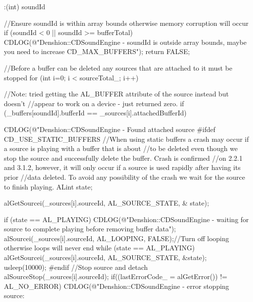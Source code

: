 \begin{DoxyCode}
                     :(int) soundId
{
        //Ensure soundId is within array bounds otherwise memory corruption
       will occur
        if (soundId < 0 || soundId >= bufferTotal) {
                CDLOG(@"Denshion::CDSoundEngine - soundId is outside array
       bounds, maybe you need to increase CD_MAX_BUFFERS");
                return FALSE;
        }

        //Before a buffer can be deleted any sources that are attached to it
       must be stopped
        for (int i=0; i < sourceTotal_; i++) {
                //Note: tried getting the AL_BUFFER attribute of the source
       instead but doesn't
                //appear to work on a device - just returned zero.
                if (_buffers[soundId].bufferId == _sources[i].attachedBufferId)
       {

                        CDLOG(@"Denshion::CDSoundEngine - Found attached source
#ifdef CD_USE_STATIC_BUFFERS
                        //When using static buffers a crash may occur if a
       source is playing with a buffer that is about
                        //to be deleted even though we stop the source and
       successfully delete the buffer. Crash is confirmed
                        //on 2.2.1 and 3.1.2, however, it will only occur if a
       source is used rapidly after having its prior
                        //data deleted. To avoid any possibility of the crash
       we wait for the source to finish playing.
                        ALint state;

                        alGetSourcei(_sources[i].sourceId, AL_SOURCE_STATE, &
      state);

                        if (state == AL_PLAYING) {
                                CDLOG(@"Denshion::CDSoundEngine - waiting for
       source to complete playing before removing buffer data");
                                alSourcei(_sources[i].sourceId, AL_LOOPING, 
      FALSE);//Turn off looping otherwise loops will never end
                                while (state == AL_PLAYING) {
                                        alGetSourcei(_sources[i].sourceId, 
      AL_SOURCE_STATE, &state);
                                        usleep(10000);
                                }
                        }
#endif
                        //Stop source and detach
                        alSourceStop(_sources[i].sourceId);
                        if((lastErrorCode_ = alGetError()) != AL_NO_ERROR) {
                                CDLOG(@"Denshion::CDSoundEngine - error
       stopping source: %
                        }

}}}
\end{DoxyCode}
